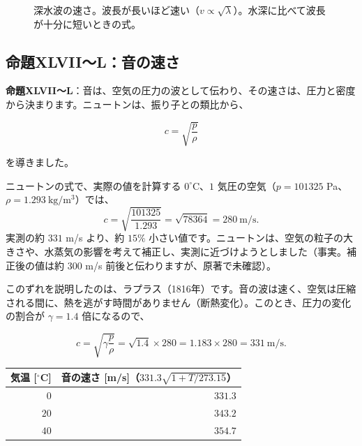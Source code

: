 \documentclass[a4paper,11pt,openany]{ltjsbook}
\begin{document}
\begin{figure}[htbp]
\centering
{}
\caption{深水波の速さ。波長が長いほど速い（$v\propto\sqrt\lambda$）。水深に比べて波長が十分に短いときの式。}
\end{figure}

\subsection{命題XLVII〜L：音の速さ}

\textbf{命題XLVII〜L}：音は、空気の圧力の波として伝わり、その速さは、圧力と密度から決まります。ニュートンは、振り子との類比から、

\[
c=\sqrt{\frac{p}{\rho}}
\]

を導きました。

\begin{examplebox}{ニュートンの式で、実際の値を計算する}
$0^\circ$C、$1$ 気圧の空気（$p=101325$ Pa、$\rho=1.293\ \mathrm{kg/m^3}$）では、
\[
c=\sqrt{\frac{101325}{1.293}}=\sqrt{78364}=280\ \text{m/s}.
\]
実測の約 $331$ m/s より、約 $15\%$ 小さい値です。ニュートンは、空気の粒子の大きさや、水蒸気の影響を考えて補正し、実測に近づけようとしました（事実。補正後の値は約 $300$ m/s 前後と伝わりますが、原著で未確認）。
\end{examplebox}

このずれを説明したのは、ラプラス（1816年）です。音の波は速く、空気は圧縮される間に、熱を逃がす時間がありません（断熱変化）。このとき、圧力の変化の割合が $\gamma=1.4$ 倍になるので、

\[
c=\sqrt{\gamma\frac{p}{\rho}}=\sqrt{1.4}\times280=1.183\times280=331\ \text{m/s}.
\]

\begin{center}
\begin{tabular}{rr}
\toprule
気温 [$^\circ$C] & 音の速さ [m/s]（$331.3\sqrt{1+T/273.15}$）\\
\midrule
$0$ & $331.3$\\
$20$ & $343.2$\\
$40$ & $354.7$\\
\bottomrule
\end{tabular}
\end{center}
\end{document}
